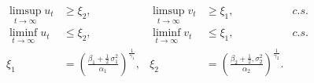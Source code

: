 \begin{frame}[plain]
{\begin{textblock*}{110mm}
\begin{Teorema}[oscilaciones]
				\begin{align*}
				 \limsup_{t \to \infty} u_t
					 &\geq \xi_2,
					 &
					 \limsup_{t \to \infty} v_t
					 &\geq\xi_1,
					 &  c.s.
				\\
				 \liminf_{t \to \infty} u_t
					 &\leq\xi_2,
					 &
					 \liminf_{t \to \infty} v_t
					 &\leq\xi_1,
					 & c.s.
				\\
				\xi_1
					&=
					\left(
						\frac{\beta_1+\frac{1}{2}\,\sigma_1^2}{\alpha_1}
					\right)^{\frac{1}{\gamma_1}
					},
					&
					\xi_2
					&=
					\left(
						\frac{\beta_2+\frac{1}{2},\sigma_2^2}{\alpha_2}
					\right)^{\frac{1}{\gamma_2}}.
				\end{align*}
			\end{Teorema}
		\end{textblock*}
	}
\end{frame}
